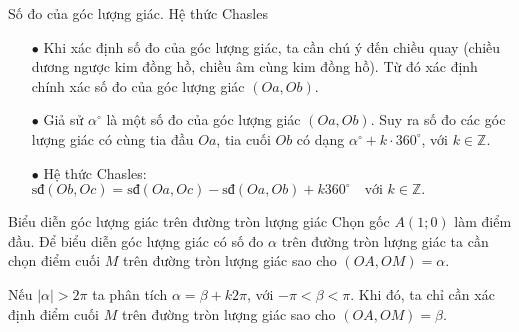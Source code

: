 \begin{dang}{Số đo của góc lượng giác. Hệ thức Chasles}
	\begin{itemize}
		\item [$\bullet$] Khi xác định số đo của góc lượng giác, ta cần chú ý đến chiều quay (chiều dương ngược kim đồng hồ, chiều âm cùng kim đồng hồ). Từ đó xác định chính xác số đo của góc lượng giác $(Oa,Ob)$.
		\item [$\bullet$] Giả sử $\alpha^\circ$ là một số đo của góc lượng giác $(Oa,Ob)$. Suy ra số đo các góc lượng giác có cùng tia đầu $Oa$, tia cuối $Ob$ có dạng $\alpha^\circ+k\cdot 360^\circ$, với $k \in 
		\mathbb{Z}$.
		\item [$\bullet$] Hệ thức Chasles: $\text{sđ}(Ob,Oc)=\text{sđ}(Oa,Oc)-\text{sđ}(Oa, Ob)+k360^{\circ} \quad \text{với } k \in \mathbb{Z}.$
	\end{itemize}
	
\end{dang}

\begin{dang}{Biểu diễn góc lượng giác trên đường tròn lượng giác}
	Chọn gốc $A\left(1;0\right)$ làm điểm đầu. Để biểu diễn góc lượng giác có số đo $\alpha $ trên đường tròn lượng giác ta cần chọn điểm cuối $M$ trên đường tròn lượng giác sao cho $(OA, OM)=\alpha$. 
	\begin{luuy}
		Nếu $\big|\alpha\big|>2\pi$ ta phân tích $\alpha =\beta + k 2\pi$, với $-\pi<\beta <\pi$. Khi đó, ta chỉ cần xác định điểm cuối $M$ trên đường tròn lượng giác sao cho $(OA, OM)=\beta.$
	\end{luuy}
\end{dang}

